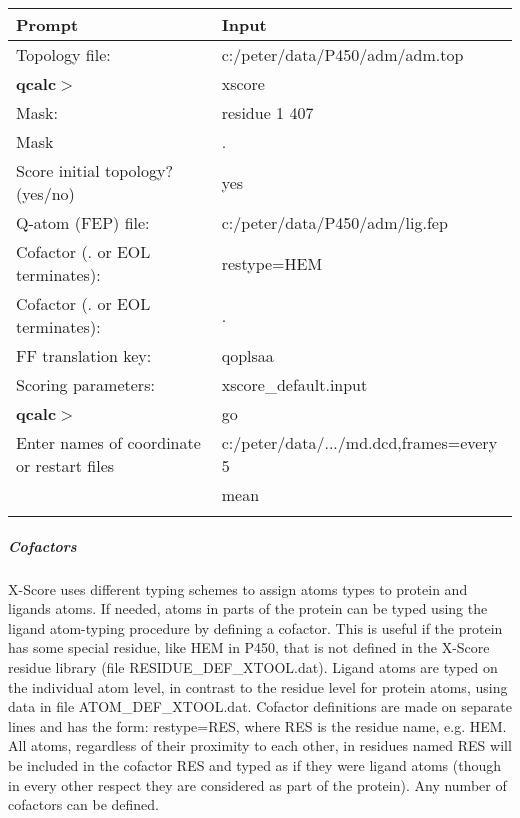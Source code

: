 \documentclass[a4paper,10pt]{article}
\begin{document}
  \begin{minipage}[t]{1.0\textwidth}
    \centering
    \begin{tabular}{ll}
      Prompt                        & Input     \\
      \hline
      Topology file:                & c:/peter/data/P450/adm/adm.top  \\
      \textbf{qcalc}$>$                        & xscore    \\
      Mask:                         & residue 1 407       \\
      Mask                          & .         \\


      Score initial topology? (yes/no) & yes                                  \\
      Q-atom (FEP) file:               & c:/peter/data/P450/adm/lig.fep  \\
      Cofactor (. or EOL terminates):  & restype=HEM                          \\
      Cofactor (. or EOL terminates):  & .                          \\
      FF translation key:              & qoplsaa                               \\
      Scoring parameters:              & xscore\_default.input                \\
      \textbf{qcalc}$>$                         & go                                   \\
      Enter names of coordinate or restart files & c:/peter/data/.../md.dcd,frames=every 5                                \\
                                   &  mean                                \\
      \hline
        & \\
    \end{tabular}
    \label{xinput}
  \end{minipage}

\subparagraph{Cofactors}
X-Score uses  different typing  schemes to  assign atoms  types to
protein and  ligands atoms. If needed,  atoms in parts of  the protein
can  be typed  using the  ligand atom-typing  procedure by  defining a
cofactor. This is useful if the protein has some special residue, like
HEM in P450, that is not  defined in the X-Score residue library (file
RESIDUE\_DEF\_XTOOL.dat).  Ligand atoms  are typed  on the  individual
atom level, in contrast to the  residue level for protein atoms, using
data in  file ATOM\_DEF\_XTOOL.dat.  Cofactor definitions  are made on
separate lines and has the form: restype=RES, where RES is the residue
name,  e.g. HEM.  All atoms,  regardless  of their  proximity to  each
other, in residues named RES will  be included in the cofactor RES and
typed as if they were ligand atoms (though in every other respect they
are considered as part of the protein). Any number of cofactors can be
defined.
\end{document}
